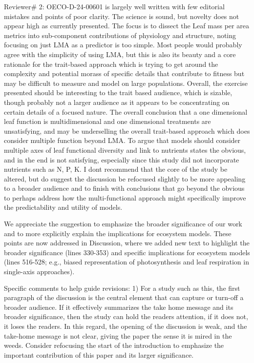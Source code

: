 \documentclass[
  12pt,
  letterpaper,
  DIV=11,
  numbers=noendperiod]{scrartcl}
\renewenvironment{quote}
  {\begin{customblockquote}\color{blockquote-text}\ignorespaces}
  {\end{customblockquote}}
\begin{document}
\begin{quote}
Reviewer\# 2: OECO-D-24-00601 is largely well written with few editorial
mistakes and points of poor clarity. The science is sound, but novelty
does not appear high as currently presented. The focus is to dissect the
Leaf mass per area metrics into sub-component contributions of
physiology and structure, noting focusing on just LMA as a predictor is
too simple. Most people would probably agree with the simplicity of
using LMA, but this is also its beauty and a core rationale for the
trait-based approach which is trying to get around the complexity and
potential morass of specific details that contribute to fitness but may
be difficult to measure and model on large populations. Overall, the
exercise presented should be interesting to the trait based audience,
which is sizable, though probably not a larger audience as it appears to
be concentrating on certain details of a focused nature. The overall
conclusion that a one dimensional leaf function is multidimensional and
one dimensional treatments are unsatisfying, and may be underselling the
overall trait-based approach which does consider multiple function
beyond LMA. To argue that models should consider multiple axes of leaf
functional diversity and link to nutrients states the obvious, and in
the end is not satisfying, especially since this study did not
incorporate nutrients such as N, P, K. I dont recommend that the core of
the study be altered, but do suggest the discussion be refocused
slightly to be more appealing to a broader audience and to finish with
conclusions that go beyond the obvious to perhaps address how the
multi-functional approach might specifically improve the predictability
and utility of models.
\end{quote}

We appreciate the suggestion to emphasize the broader significance of
our work and to more explicitly explain the implications for ecosystem
models. These points are now addressed in Discussion, where we added new
text to highlight the broader significance (lines 330-353) and specific
implications for ecosystem models (lines 516-528; e.g., biased
representation of photosynthesis and leaf respiration in single-axis
approaches).

\begin{quote}
Specific comments to help guide revisions: 1) For a study such as this,
the first paragraph of the discussion is the central element that can
capture or turn-off a broader audience. If it effectively summarizes the
take home message and its broader significance, then the study can hold
the readers attention, if it does not, it loses the readers. In this
regard, the opening of the discussion is weak, and the take-home message
is not clear, giving the paper the sense it is mired in the weeds.
Consider refocusing the start of the introduction to emphasize the
important contribution of this paper and its larger significance.
\end{quote}
\end{document}
